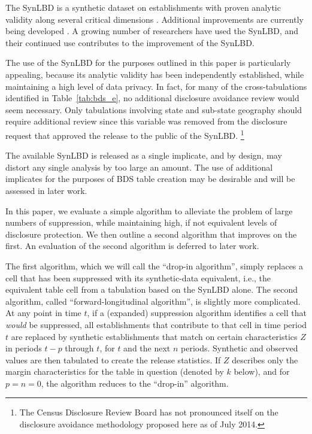 
The \ac{SynLBD} is a synthetic dataset on establishments with proven analytic validity along several critical dimensions \cite{KinneyEtAl2011}. Additional improvements are currently being developed \cite{KinneyEtAl2013,CES-WP-2014-12}. A growing number of researchers have used the \ac{SynLBD}, and their continued use contributes to the improvement of the \ac{SynLBD}. 

The use of the \ac{SynLBD} for the purposes outlined in this paper is particularly appealing, because its analytic validity has been independently established, while maintaining a high level of data privacy. In fact, for many of the cross-tabulations identified in Table~\ref{tab:bds_e}, no additional disclosure avoidance review would seem necessary. Only tabulations involving state and sub-state geography should require additional review since this variable was removed from the disclosure request that approved the release to the public of the SynLBD.%
\footnote{The Census Disclosure Review Board has not pronounced itself on the disclosure avoidance methodology proposed here as of July 2014.}
 
The available \ac{SynLBD} is released as a single implicate, and by design, may distort any single analysis by too large an amount. The use of additional implicates for the purposes of BDS table creation may be desirable and will be assessed in later work. 

In this paper, we evaluate a simple algorithm to alleviate the problem of large numbers of 
suppression, while maintaining high, if not equivalent levels of disclosure protection. We then 
outline a second algorithm that improves on the first.  An evaluation of the second algorithm is 
deferred to later work. 

The first algorithm, which we will call the ``drop-in algorithm'', simply replaces a cell that has 
been suppressed with its synthetic-data equivalent, i.e., the equivalent table cell from a 
tabulation based on the \ac{SynLBD} alone. The second algorithm, called 
``forward-longitudinal algorithm'', is slightly more complicated. At any point in time $t$, if a 
(expanded) suppression algorithm identifies a cell that \emph{would} be suppressed, all 
establishments that contribute to that cell in  time period $t$ are replaced by synthetic 
establishments that match on certain characteristics $Z$ in periods $t-p$ through $t$, for $t$ 
and the next $n$ periods. Synthetic and observed values are then tabulated to create the 
release statistics. If $Z$ describes only the margin characteristics for the table in question 
(denoted by $k$ below), and for $p=n=0$, the algorithm reduces to the ``drop-in'' algorithm. 

